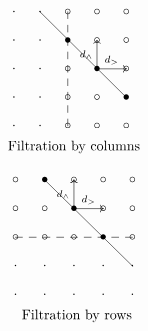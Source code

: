 \documentclass[../main.tex]{subfiles}
\begin{document}
\begin{minipage}{0.5\textwidth}
\begin{align*}
&\xymatrix@=10pt{
 \cdot & \cdot\ar@{-}[]+C;[rrrddd]+C & \circ \ar@{--}[]+C;[dddd]+C& \circ & \circ \\
 \cdot & \cdot & \bullet & \circ & \circ \\
 \cdot & \cdot & \circ & \bullet\ar[]+C;[r]+C^{d_>}\ar[]+C;[u]+C^{d_{\wedge}} & \circ \\
 \cdot & \cdot & \circ & \circ & \bullet \\
 \cdot & \cdot & \circ & \circ & \circ  \\}
&\\
&\text{Filtration by columns}
\end{align*}
\end{minipage}
\begin{minipage}{0.5\textwidth}
\begin{align*}
&\xymatrix@=10pt{
 \circ & \bullet\ar@{-}[]+C;[rrrddd]+C & \circ & \circ & \circ \\
 \circ & \frm{**}\circ & \bullet \ar[]+C;[r]+C^{d_>}\ar[]+C;[u]+C^{d_{\wedge}}& \circ & \circ \\
 \circ \ar@{--}[]+C;[rrrr]+C & \circ & \circ & \bullet & \circ \\
 \cdot & \cdot & \cdot & \cdot & \cdot \\
 \cdot & \cdot & \cdot & \cdot & \cdot \\
  }
&\\
&\hspace{10pt}\text{Filtration by rows}
\end{align*}
\end{minipage}
\end{document}
